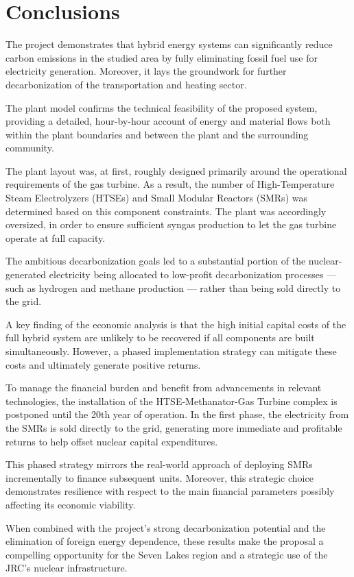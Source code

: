 \section{Conclusions}

The project demonstrates that hybrid energy systems can significantly reduce carbon emissions in the studied area by fully eliminating fossil 
fuel use for electricity generation. Moreover, it lays the groundwork for further decarbonization of the transportation and heating sector.

The plant model confirms the technical feasibility of the proposed system, providing a detailed, hour-by-hour account of energy and material 
flows both within the plant boundaries and between the plant and the surrounding community.

The plant layout was, at first, roughly designed primarily around the operational requirements of the gas turbine. As a result, the number of High-Temperature 
Steam Electrolyzers (HTSEs) and Small Modular Reactors (SMRs) was determined based on this component constraints. 
The plant was accordingly oversized, in order to ensure sufficient syngas production to let the gas turbine operate at full capacity.

The ambitious decarbonization goals led to a substantial portion of the nuclear-generated electricity being allocated to 
low-profit decarbonization processes — such as hydrogen and methane production — rather than being sold directly to the grid.

A key finding of the economic analysis is that the high initial capital costs of the full hybrid system are unlikely to be recovered if all 
components are built simultaneously. However, a phased implementation strategy can mitigate these costs and ultimately generate positive returns.

To manage the financial burden and benefit from advancements in relevant technologies, the installation of the 
HTSE-Methanator-Gas Turbine complex is postponed until the 20th year of operation. 
In the first phase, the electricity from the SMRs is sold directly to the grid, generating more immediate and profitable returns 
to help offset nuclear capital expenditures.

This phased strategy mirrors the real-world approach of deploying SMRs incrementally to finance subsequent units. 
Moreover, this strategic choice demonstrates resilience with respect to the main financial parameters possibly affecting its economic viability.

When combined with the project's strong decarbonization potential and the elimination of foreign energy dependence, these results make 
the proposal a compelling opportunity for the Seven Lakes region and a strategic use of the JRC's nuclear infrastructure.